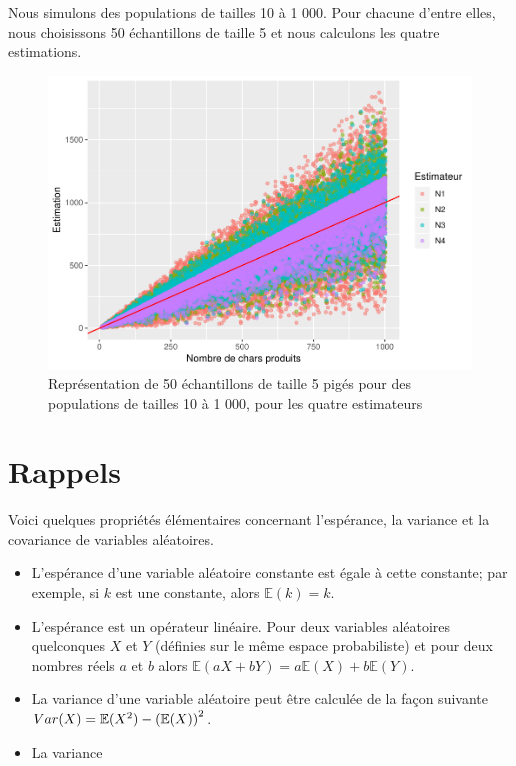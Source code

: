 \documentclass[10pt]{article}
\begin{document}
Nous simulons des populations de tailles 10 à 1 000. Pour chacune
d'entre elles, nous choisissons 50 échantillons de taille 5 et nous
calculons les quatre estimations.

\begin{figure}

{\centering \includegraphics[width=0.9\linewidth]{serial_number_amq_files/figure-latex/ech-10-1000-1} 

}

\caption{Représentation de 50 échantillons de taille 5 pigés pour des populations de tailles 10 à 1 000, pour les quatre estimateurs}\label{fig:ech-10-1000}
\end{figure}

\appendix

\section{\texorpdfstring{Rappels
\label{rappel_esperance}}{Rappels }}\label{rappels}

Voici quelques propriétés élémentaires concernant l'espérance, la
variance et la covariance de variables aléatoires.

\begin{itemize}
\item
  L'espérance d'une variable aléatoire constante est égale à cette
  constante; par exemple, si \(k\) est une constante, alors
  \(\mathbb{E}(k)=k\).
\item
  L'espérance est un opérateur linéaire. Pour deux variables aléatoires
  quelconques \(X\) et \(Y\) (définies sur le même espace probabiliste)
  et pour deux nombres réels \(a\) et \(b\) alors
  \(\mathbb{E}(aX+bY)=a\mathbb{E}(X)+b\mathbb{E}(Y)\).
\item
  La variance d'une variable aléatoire peut être calculée de la façon
  suivante \(Var(X)=\mathbb{E}(X^2)-\left(\mathbb{E}(X)\right)^2\).
\item
  La variance
\end{itemize}
\end{document}
